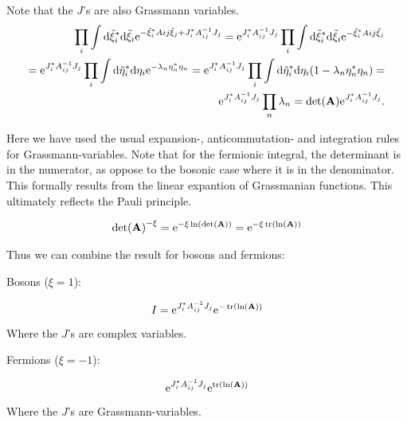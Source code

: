Note that the $J$'s are also Grassmann variables. 
\begin{align}
    \prod_{i} \int \dd \Tilde{\xi}_{i}^{*} \dd \Tilde{\xi}_{i} \mathrm{e}^{-\Tilde{\xi}_{i}^{*}A{ij} \Tilde{\xi}_{j} + J_{i}^{*}A_{ij}^{-1}J_{j}} = \mathrm{e}^{J_{i}^{*}A_{ij}^{-1}J_{j}} \prod_{i} \int \dd \Tilde{\xi}_{i}^{*} \dd \Tilde{\xi}_{i} \mathrm{e}^{-\Tilde{\xi}_{i}^{*}A{ij} \Tilde{\xi}_{j}} \nonumber \\ = \mathrm{e}^{J_{i}^{*}A_{ij}^{-1}J_{j}} \prod_{i} \int \dd \Tilde{\eta}_{i}^{*} \dd \eta_{i} \mathrm{e}^{-\lambda_{n}\eta_{n}^{*}\eta_{n}} = \mathrm{e}^{J_{i}^{*}A_{ij}^{-1}J_{j}} \prod_{i} \int \dd \Tilde{\eta}_{i}^{*} \dd \eta_{i} (1 -\lambda_{n}\eta_{n}^{*}\eta_{n}) = \nonumber \\ \mathrm{e}^{J_{i}^{*}A_{ij}^{-1}J_{j}} \prod_{n} \lambda_{n} =  \det(\vb{A}) \mathrm{e}^{J_{i}^{*}A_{ij}^{-1}J_{j}}. 
\end{align}

Here we have used the usual expansion-, anticommutation- and integration rules for Grassmann-variables. Note that for the fermionic integral, the determinant is in the numerator, as oppose to the bosonic case where it is in the denominator. This formally results from the linear expantion of Grassmanian functions. This ultimately reflects the Pauli principle. 

\begin{align*}
    \det(\vb{A})^{-\xi} = \mathrm{e}^{-\xi \ln(\det(\vb{A}))} = \mathrm{e}^{-\xi  \tr(\ln(\vb{A}))}
\end{align*}

Thus we can combine the result for bosons and fermions: 

Bosons ($\xi = 1$):

\begin{equation}
    I = \mathrm{e}^{J_{i}^{*}A_{ij}^{-1}J_{j}}\mathrm{e}^{- \tr(\ln(\vb{A}))}
\end{equation}

Where the $J$'s are complex variables. 

Fermions ($\xi = -1$): 

\begin{equation}
    \mathrm{e}^{J_{i}^{*}A_{ij}^{-1}J_{j}}\mathrm{e}^{\tr(\ln(\vb{A}))}
\end{equation}

Where the $J$'s are Grassmann-variables. 

